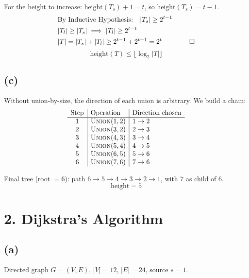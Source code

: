 \documentclass[11pt]{article}
\begin{document}
For the height to increase: $\text{height}(T_s) + 1 = t$, so $\text{height}(T_s) = t - 1$.
\begin{align*}
&\text{By Inductive Hypothesis:} \quad |T_s| \ge 2^{t-1} \\
&|T_l| \ge |T_s| \implies |T_l| \ge 2^{t-1} \\
&|T| = |T_s| + |T_l| \ge 2^{t-1} + 2^{t-1} = 2^t \qquad \qed
\end{align*}
\[\boxed{\text{height}(T) \le \lfloor \log_2 |T| \rfloor}\]

\vspace{-20pt}
\subsection*{(c)}

Without union-by-size, the direction of each union is arbitrary. We build a chain:
\[
\begin{array}{c|l|l}
\text{Step} & \text{Operation} & \text{Direction chosen} \\ \hline
1 & \textsc{Union}(1,2) & 1 \to 2 \\
2 & \textsc{Union}(3,2) & 2 \to 3 \\
3 & \textsc{Union}(4,3) & 3 \to 4 \\
4 & \textsc{Union}(5,4) & 4 \to 5 \\
5 & \textsc{Union}(6,5) & 5 \to 6 \\
6 & \textsc{Union}(7,6) & 7 \to 6
\end{array}
\]

Final tree (root $= 6$): path $6 \to 5 \to 4 \to 3 \to 2 \to 1$, with $7$ as child of $6$.
\[\boxed{\text{height} = 5}\]


\section*{2. Dijkstra's Algorithm}

\vspace{-10pt}
\subsection*{(a)}
\vspace{-10pt}

Directed graph $G = (V, E)$, $|V| = 12$, $|E| = 24$, source $s = 1$.
\end{document}
